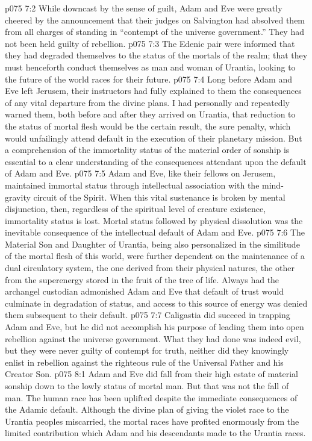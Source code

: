 \vs p075 7:2 While downcast by the sense of guilt, Adam and Eve were greatly cheered by the announcement that their judges on Salvington had absolved them from all charges of standing in “contempt of the universe government.” They had not been held guilty of rebellion.
\vs p075 7:3 The Edenic pair were informed that they had degraded themselves to the status of the mortals of the realm; that they must henceforth conduct themselves as man and woman of Urantia, looking to the future of the world races for their future.
\vs p075 7:4 Long before Adam and Eve left Jerusem, their instructors had fully explained to them the consequences of any vital departure from the divine plans. I had personally and repeatedly warned them, both before and after they arrived on Urantia, that reduction to the status of mortal flesh would be the certain result, the sure penalty, which would unfailingly attend default in the execution of their planetary mission. But a comprehension of the immortality status of the material order of sonship is essential to a clear understanding of the consequences attendant upon the default of Adam and Eve.
\pc \vs p075 7:5 \bibnobreakspace Adam and Eve, like their fellows on Jerusem, maintained immortal status through intellectual association with the mind\hyp{}gravity circuit of the Spirit. When this vital sustenance is broken by mental disjunction, then, regardless of the spiritual level of creature existence, immortality status is lost. Mortal status followed by physical dissolution was the inevitable consequence of the intellectual default of Adam and Eve.
\pc \vs p075 7:6 \bibnobreakspace The Material Son and Daughter of Urantia, being also personalized in the similitude of the mortal flesh of this world, were further dependent on the maintenance of a dual circulatory system, the one derived from their physical natures, the other from the superenergy stored in the fruit of the tree of life. Always had the archangel custodian admonished Adam and Eve that default of trust would culminate in degradation of status, and access to this source of energy was denied them subsequent to their default.
\pc \vs p075 7:7 Caligastia did succeed in trapping Adam and Eve, but he did not accomplish his purpose of leading them into open rebellion against the universe government. What they had done was indeed evil, but they were never guilty of contempt for truth, neither did they knowingly enlist in rebellion against the righteous rule of the Universal Father and his Creator Son.
\vs p075 8:1 Adam and Eve did fall from their high estate of material sonship down to the lowly status of mortal man. But that was not the fall of man. The human race has been uplifted despite the immediate consequences of the Adamic default. Although the divine plan of giving the violet race to the Urantia peoples miscarried, the mortal races have profited enormously from the limited contribution which Adam and his descendants made to the Urantia races.
